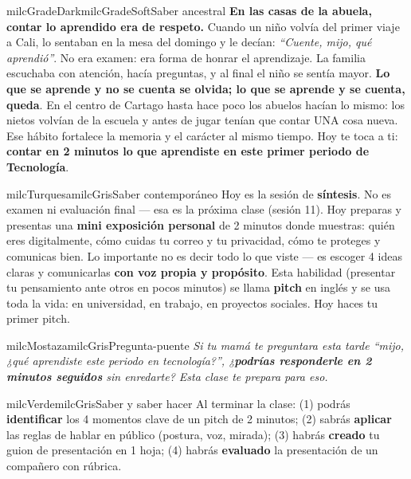 \documentclass[11pt,letterpaper]{article}
\begin{document}
\begin{softbox}{milcGradeDark}{milcGradeSoft}{Saber ancestral}
\textbf{En las casas de la abuela, contar lo aprendido era de respeto.} Cuando un niño volvía del primer viaje a Cali, lo sentaban en la mesa del domingo y le decían: \emph{``Cuente, mijo, qué aprendió''}. No era examen: era forma de honrar el aprendizaje. La familia escuchaba con atención, hacía preguntas, y al final el niño se sentía mayor. \textbf{Lo que se aprende y no se cuenta se olvida; lo que se aprende y se cuenta, queda}. En el centro de Cartago hasta hace poco los abuelos hacían lo mismo: los nietos volvían de la escuela y antes de jugar tenían que contar UNA cosa nueva. Ese hábito fortalece la memoria y el carácter al mismo tiempo. Hoy te toca a ti: \textbf{contar en 2 minutos lo que aprendiste en este primer periodo de Tecnología}.
\end{softbox}

\begin{softbox}{milcTurquesa}{milcGris}{Saber contemporáneo}
Hoy es la sesión de \textbf{síntesis}. No es examen ni evaluación final --- esa es la próxima clase (sesión 11). Hoy preparas y presentas una \textbf{mini exposición personal} de 2 minutos donde muestras: quién eres digitalmente, cómo cuidas tu correo y tu privacidad, cómo te proteges y comunicas bien. Lo importante no es decir todo lo que viste --- es escoger 4 ideas claras y comunicarlas \textbf{con voz propia y propósito}. Esta habilidad (presentar tu pensamiento ante otros en pocos minutos) se llama \textbf{pitch} en inglés y se usa toda la vida: en universidad, en trabajo, en proyectos sociales. Hoy haces tu primer pitch.
\end{softbox}

\begin{softbox}{milcMostaza}{milcGris}{Pregunta-puente}
\textit{Si tu mamá te preguntara esta tarde \emph{``mijo, ¿qué aprendiste este periodo en tecnología?''}, ¿\textbf{podrías responderle en 2 minutos seguidos} sin enredarte? Esta clase te prepara para eso.}
\end{softbox}

\begin{softbox}{milcVerde}{milcGris}{Saber y saber hacer}
Al terminar la clase: (1) podrás \textbf{identificar} los 4 momentos clave de un pitch de 2 minutos; (2) sabrás \textbf{aplicar} las reglas de hablar en público (postura, voz, mirada); (3) habrás \textbf{creado} tu guion de presentación en 1 hoja; (4) habrás \textbf{evaluado} la presentación de un compañero con rúbrica.
\end{softbox}
\end{document}
